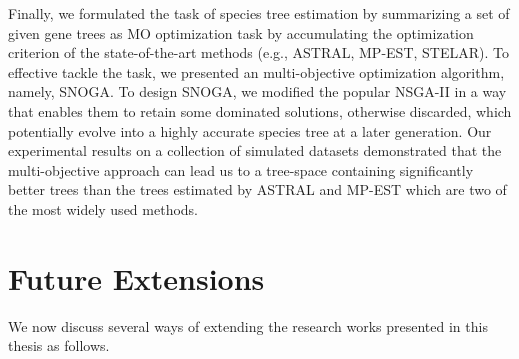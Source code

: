 Finally, we formulated the task of species tree estimation by summarizing a set of given gene trees as MO optimization task by accumulating the optimization criterion of the state-of-the-art methods (e.g., ASTRAL, MP-EST, STELAR). To effective tackle the task, we presented an multi-objective optimization algorithm, namely, SNOGA. To design SNOGA, we modified the popular NSGA-II in a way that enables them to retain some dominated solutions, otherwise discarded, which potentially evolve into a highly accurate species tree at a later generation. Our experimental results on a collection of simulated datasets demonstrated that the multi-objective approach can lead us to a tree-space containing significantly better trees than the trees estimated by ASTRAL and MP-EST which are two of the most widely used methods. 


\section{Future Extensions}
We now discuss several ways of extending the research works presented in this thesis as follows.
